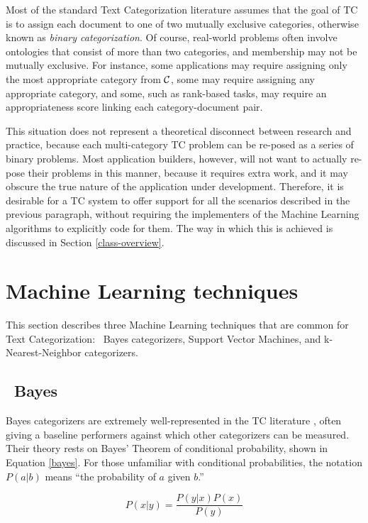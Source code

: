 Most of the standard Text Categorization literature assumes that the
goal of TC is to assign each document to one of two mutually exclusive
categories, otherwise known as \emph{binary
categorization}.\cite[p. 3]{sebastiani:02} Of course, real-world
problems often involve ontologies that consist of more than two
categories, and membership may not be mutually exclusive.  For
instance, some applications may require assigning only the most
appropriate category from $\mathcal{C}$, some may require assigning any
appropriate category, and some, such as rank-based tasks, may require
an appropriateness score linking each category-document pair.

This situation does not represent a theoretical disconnect between
research and practice, because each multi-category TC problem can be
re-posed as a series of binary problems.  Most application builders,
however, will not want to actually re-pose their problems in this
manner, because it requires extra work, and it may obscure the true
nature of the application under development.  Therefore, it is
desirable for a TC system to offer support for all the scenarios
described in the previous paragraph, without requiring the
implementers of the Machine Learning algorithms to explicitly code for
them.  The way in which this is achieved is discussed in Section
\ref{class-overview}.

\section{Machine Learning techniques}
\label{machine-learning}

This section describes three Machine Learning techniques that are
common for Text Categorization: \naive\ Bayes categorizers, Support
Vector Machines, and k-Nearest-Neighbor categorizers.

\subsection{\naive\ Bayes}

\naive Bayes categorizers are extremely well-represented in the TC
literature \cite{lewis:98,yang:99,sebastiani:02}, often giving a
baseline performers against which other categorizers can be measured.
Their theory rests on Bayes' Theorem of conditional probability, shown
in Equation \ref{bayes}.  For those unfamiliar with conditional
probabilities, the notation $P(a|b)$ means ``the probability of $a$
given $b$.''

\begin{equation} \label{bayes}
P(x|y) = \frac{P(y|x) P(x)}{P(y)}
\end{equation}


